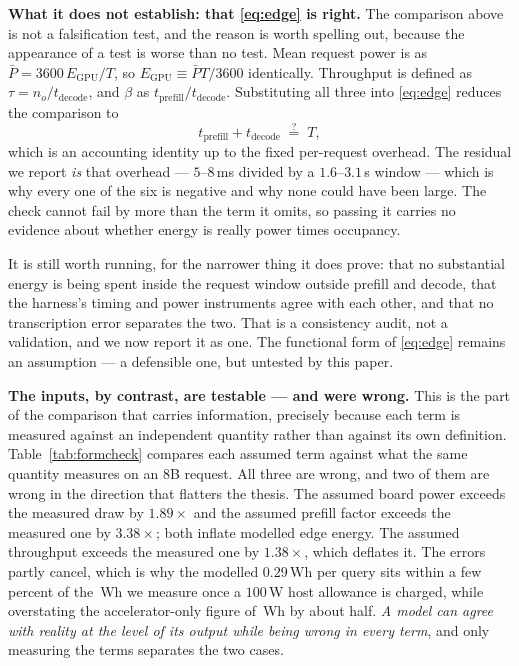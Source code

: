 \documentclass[conference]{IEEEtran}
\newcommand{\Wh}{\,\text{Wh}}
\begin{document}
\textbf{What it does not establish: that \eqref{eq:edge} is right.} The
comparison above is not a falsification test, and the reason is worth
spelling out, because the appearance of a test is worse than no test.
Mean request power is
as $\bar{P} = 3600\,E_{\text{GPU}}/T$, so $E_{\text{GPU}} \equiv \bar{P}T/3600$
identically. Throughput is defined as $\tau = n_o/t_{\text{decode}}$, and
$\beta$ as $t_{\text{prefill}}/t_{\text{decode}}$. Substituting all three into
\eqref{eq:edge} reduces the comparison to
\begin{equation}
t_{\text{prefill}} + t_{\text{decode}} \;\stackrel{?}{=}\; T,
\label{eq:identity}
\end{equation}
which is an accounting identity up to the fixed per-request overhead. The
residual we report \emph{is} that overhead --- $5$--$8$\,ms divided by a
$1.6$--$3.1$\,s window --- which is why every one of the six is negative and why
none could have been large. The check cannot fail by more than the term it
omits, so passing it carries no evidence about whether energy is really power
times occupancy.

It is still worth running, for the narrower thing it does prove: that no
substantial energy is being spent inside the request window outside prefill and
decode, that the harness's timing and power instruments agree with each other,
and that no transcription error separates the two. That is a consistency audit,
not a validation, and we now report it as one. The functional form of
\eqref{eq:edge} remains an assumption --- a defensible one, but untested by this
paper.

\textbf{The inputs, by contrast, are testable --- and were wrong.} This is the
part of the comparison that carries information, precisely because each term is
measured against an independent quantity rather than against its own definition.
Table~\ref{tab:formcheck} compares each assumed term against what the same
quantity measures on an 8B request. All three are
wrong, and two of them are wrong in the direction that flatters the thesis. The
assumed board power exceeds the measured draw by $1.89\times$ and the assumed
prefill factor exceeds the measured one by $3.38\times$; both inflate modelled
edge energy. The assumed throughput exceeds the measured one by $1.38\times$,
which deflates it. The errors partly cancel, which is why the modelled
$0.29\Wh$ per query sits within a few percent of the
\RtxEightHostHundred{}\,Wh we measure once a $100$\,W host allowance is charged,
while overstating the accelerator-only figure of \RtxEightEnergy{}\,Wh by about
half. \emph{A model can agree with reality at the level of its output while
being wrong in every term}, and only measuring the terms separates the two
cases.
\end{document}
